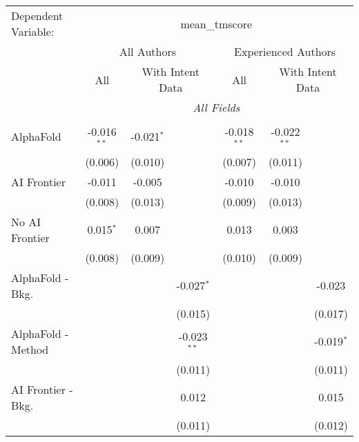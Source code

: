 \begingroup
\centering
\begin{tabular}{lcccccc}
   \tabularnewline \midrule \midrule
   Dependent Variable: & \multicolumn{6}{c}{mean\_tmscore}\\
 & \multicolumn{3}{c}{All Authors} & \multicolumn{3}{c}{Experienced Authors} \\
\cmidrule(lr){2-4} \cmidrule(lr){5-7}
 & \multicolumn{1}{c}{All} & \multicolumn{2}{c}{With Intent Data} & \multicolumn{1}{c}{All} & \multicolumn{2}{c}{With Intent Data} \\
\cmidrule(lr){2-2} \cmidrule(lr){3-4} \cmidrule(lr){5-5} \cmidrule(lr){6-7}
 & \multicolumn{6}{c}{\textit{All Fields}} \\ \\
   AlphaFold               & -0.016$^{**}$ & -0.021$^{*}$ &               & -0.018$^{**}$ & -0.022$^{**}$ &   \\   
                           & (0.006)       & (0.010)      &               & (0.007)       & (0.011)       &   \\   
   AI Frontier             & -0.011        & -0.005       &               & -0.010        & -0.010        &   \\   
                           & (0.008)       & (0.013)      &               & (0.009)       & (0.013)       &   \\   
   No AI Frontier          & 0.015$^{*}$   & 0.007        &               & 0.013         & 0.003         &   \\   
                           & (0.008)       & (0.009)      &               & (0.010)       & (0.009)       &   \\   
   AlphaFold - Bkg.        &               &              & -0.027$^{*}$  &               &               & -0.023\\   
                           &               &              & (0.015)       &               &               & (0.017)\\   
   AlphaFold - Method      &               &              & -0.023$^{**}$ &               &               & -0.019$^{*}$\\   
                           &               &              & (0.011)       &               &               & (0.011)\\   
   AI Frontier - Bkg.      &               &              & 0.012         &               &               & 0.015\\   
                           &               &              & (0.011)       &               &               & (0.012)\\   

\end{tabular}
